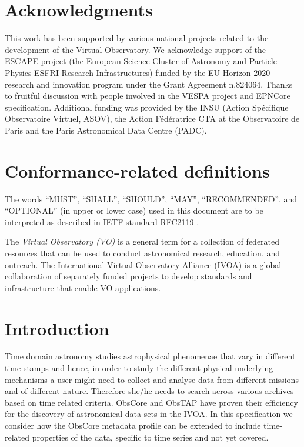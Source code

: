 \documentclass[11pt,a4paper]{ivoa}
\begin{document}
\section*{Acknowledgments}
This work has been supported by various national projects related to the development of the Virtual Observatory.
 We acknowledge support of the  ESCAPE project (the European Science Cluster of Astronomy and Particle Physics ESFRI Research Infrastructures) funded by the EU Horizon 2020 research and innovation program under the Grant Agreement n.824064. Thanks to fruitful discussion with people involved in the VESPA project and EPNCore specification.
 Additional funding was provided by the INSU (Action Sp\'ecifique Observatoire Virtuel, ASOV), the Action F\'ed\'eratrice CTA at the Observatoire de Paris and the Paris Astronomical Data Centre (PADC).

\section*{Conformance-related definitions}

The words ``MUST'', ``SHALL'', ``SHOULD'', ``MAY'', ``RECOMMENDED'', and
``OPTIONAL'' (in upper or lower case) used in this document are to be
interpreted as described in IETF standard RFC2119 \citep{std:RFC2119}.

The \emph{Virtual Observatory (VO)} is a
general term for a collection of federated resources that can be used
to conduct astronomical research, education, and outreach.
The \href{https://www.ivoa.net}{International
Virtual Observatory Alliance (IVOA)} is a global
collaboration of separately funded projects to develop standards and
infrastructure that enable VO applications.



\section{Introduction}

Time domain astronomy studies astrophysical phenomenae that vary in different time stamps and hence, in order to study the different physical underlying mechanisms a user might need to collect and analyse data from different missions and of different nature. Therefore she/he needs to search across various archives based on time related criteria.
ObsCore and ObsTAP  \citep{2017ivoa.spec.0509L} have proven their efficiency for the discovery of astronomical data sets in the IVOA.
In this specification we consider how the ObsCore metadata profile can be extended to include time-related properties of the data, specific to time series and not yet covered.
\end{document}
